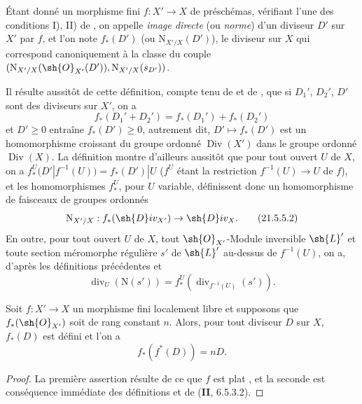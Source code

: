 
\begin{definition}[21.5.5]
Étant donné un morphisme fini $f:X'\to X$ de préschémas, vérifiant l'une des conditions I), II) de , on appelle \emph{image directe} (ou \emph{norme}) d'un diviseur $D'$ sur $X'$ par $f$, et l'on note $f_*(D')$ (ou $\mathrm{N}_{X'/X}(D')$), le diviseur sur $X$ qui correspond canoniquement  à la classe du couple $(\mathrm{N}_{X'/X}(\sh{O}_{X'}(D')),\mathrm{N}_{X'/X}(s_{D'}))$.
\end{definition}

Il résulte aussitôt de cette définition, compte tenu de  et de , que si $D_1'$, $D_2'$, $D'$ sont des diviseurs sur $X'$, on a
\[
\label{IV.21.5.5.1}
  f_*(D_1'+D_2')=f_*(D_1')+f_*(D_2')
  \tag{21.5.5.1}
\]
et $D'\geq0$ entraîne $f_*(D')\geq0$, autrement dit, $D'\mapsto f_*(D')$ est un homomorphisme croissant du groupe ordonné $\operatorname{Div}(X')$ dans le groupe ordonné $\operatorname{Div}(X)$.
La définition  montre d'ailleurs aussitôt que pour tout ouvert $U$ de $X$, on a $f_*^U(D'|f^{-1}(U))=f_*(D')|U$ ($f^U$ étant la restriction $f^{-1}(U)\to U$ de $f$), et les homomorphismes $f_*^U$, pour $U$ variable, définissent donc un homomorphisme de faisceaux de groupes ordonnés
\[
\label{IV.21.5.5.2}
  \mathrm{N}_{X'/X}:f_*(\sh{D}iv_{X'})\to\sh{D}iv_X.
  \tag{21.5.5.2}
\]
En outre, pour tout ouvert $U$ de $X$, tout $\sh{O}_{X'}$-Module inversible $\sh{L}'$ et toute section méromorphe régulière $s'$ de $\sh{L}'$ au-dessus de $f^{-1}(U)$, on a, d'après les définitions précédentes et 
\[
\label{IV.21.5.5.3}
  \operatorname{div}_U(\mathrm{N}(s'))=f_*^U(\operatorname{div}_{f^{-1}(U)}(s')).
  \tag{21.5.5.3}
\]

\begin{proposition}[21.5.6]
\label{IV.21.5.6}
Soit $f:X'\to X$ un morphisme fini localement libre et supposons que $f_*(\sh{O}_{X'})$ soit de rang constant $n$.
Alors, pour tout diviseur $D$ sur $X$, $f_*(D)$ est défini et l'on a
\[
\label{IV.21.5.6.1}
  f_*(f^*(D))=nD.
  \tag{21.5.6.1}
\]
\end{proposition}

\begin{proof}
La première assertion résulte de ce que $f$ est plat , et la seconde est conséquence immédiate des définitions et de (\textbf{II}, 6.5.3.2).
\end{proof}

